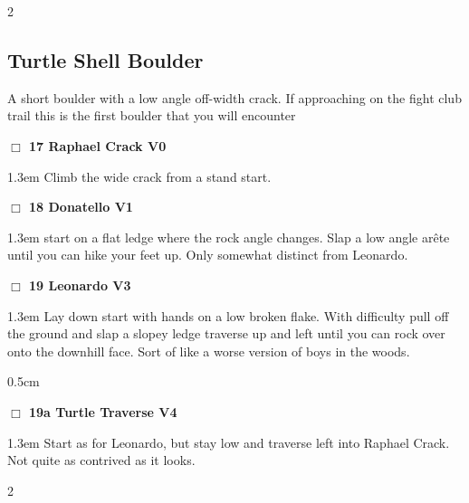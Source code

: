 \begin{multicols}{2}
\subsection*{Turtle Shell Boulder}\label{bf:Turtle Shell Boulder}
A short boulder with a low angle off-width crack. If approaching on the fight club trail this is the first boulder that you will encounter\\
\needspace{2em}
\label{rt:Raphael Crack}
\colorbox{green!20}{
\parbox{0.95\linewidth}{
\hspace{-1ex}\textbf{$\Box$
17 Raphael Crack V0  
}}}
\begin{adjustwidth}{1.3em}{}			
Climb the wide crack from a stand start.
\end{adjustwidth}
\needspace{2em}
\label{rt:Donatello}
\colorbox{green!20}{
\parbox{0.95\linewidth}{
\hspace{-1ex}\textbf{$\Box$
18 Donatello V1  
}}}
\begin{adjustwidth}{1.3em}{}			
start on a flat ledge where the rock angle changes. Slap a low angle arête until you can hike your feet up. Only somewhat distinct from Leonardo.
\end{adjustwidth}
\needspace{2em}
\label{rt:Leonardo}
\colorbox{green!20}{
\parbox{0.95\linewidth}{
\hspace{-1ex}\textbf{$\Box$
19 Leonardo V3  
}}}
\begin{adjustwidth}{1.3em}{}			
Lay down start with hands on a low broken flake. With difficulty pull off the ground and slap a slopey ledge traverse up and left until you can rock over onto the downhill face. Sort of like a worse version of boys in the woods.
\end{adjustwidth}
\begin{adjustwidth}{0.5cm}{}				
\needspace{4em}
\needspace{2em}
\label{vr:Turtle Traverse}
\colorbox{RoyalBlue!20}{
\parbox{0.95\linewidth}{
\hspace{-1ex}\textbf{$\Box$
19a Turtle Traverse V4  
}}}
\begin{adjustwidth}{1.3em}{}			
Start as for Leonardo, but stay low and traverse left into Raphael Crack. Not quite as contrived as it looks.
\end{adjustwidth}
\end{adjustwidth}
	\end{multicols}
\newpage
	\begin{multicols}{2}
	\end{multicols}
